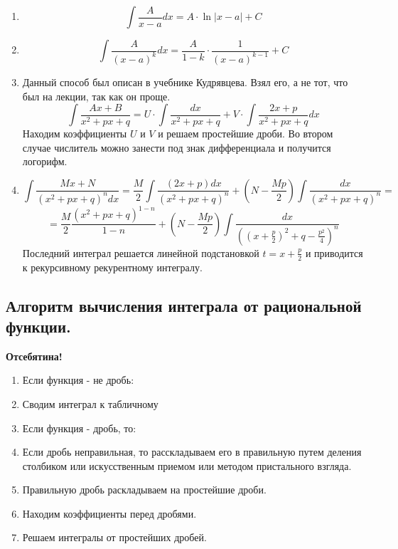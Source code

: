 \documentclass[a4paper,12pt]{article}
\theoremstyle{plain} %
\theoremstyle{definition} %
\theoremstyle{remark} %
\begin{document}
\begin{enumerate}
	\item \[ \int \frac{A}{x - a}dx = A \cdot \ln|x - a| + C \]
	\item \[ \int \frac{A}{(x-a)^k}dx = \frac{A}{1 - k} \cdot \frac{1}{(x - a)^{k - 1}} + C \]
	\item Данный способ был описан в учебнике Кудрявцева. Взял его, а не тот, что был на лекции, так как он проще.
	      \[ \int \frac{Ax + B}{x^2 + px + q} = U \cdot \int \frac{dx}{x^2 + px + q} + V \cdot \int \frac{2x + p}{x^2 + px + q}dx \]
	      Находим коэффициенты $U$ и $V$ и решаем простейшие дроби. Во втором случае числитель можно занести под знак дифференциала и получится логорифм.
	\item \[ \int  \frac{Mx + N}{(x^2 + px + q)^n dx} = \frac{M}{2} \int \frac{(2x + p)dx}{(x^2 + px + q)^n} + \left( N - \frac{Mp}{2} \right) \int \frac{dx}{(x^2 + px + q)^n} =   \]
	      \[ = \frac{M}{2} \frac{(x^2 + px + q)^{1 - n}}{1 - n} + \left( N - \frac{Mp}{2} \right) \int \frac{dx}{\left( (x + \frac{p}{2})^2  + q - \frac{p^2}{4}\right)^n}  \]
	      Последний интеграл решается линейной подстановкой $t = x + \frac{p}{2}$ и приводится к рекурсивному рекурентному интегралу.
\end{enumerate}

\newpage
\subsection*{Алгоритм вычисления интеграла от рациональной функции.} \label{algo_rac_int}

\textbf{Отсебятина!}

\begin{enumerate}
	\item Если функция - не дробь:
	\item Сводим интеграл к табличному
	\item Если функция - дробь, то:
	\item Если дробь неправильная, то расскладываем его в правильную путем деления столбиком или искусственным приемом или методом пристального взгляда.
	\item Правильную дробь раскладываем на простейшие дроби.
	\item Находим коэффициенты перед дробями.
	\item Решаем интегралы от простейших дробей.
\end{enumerate}
\end{document}
